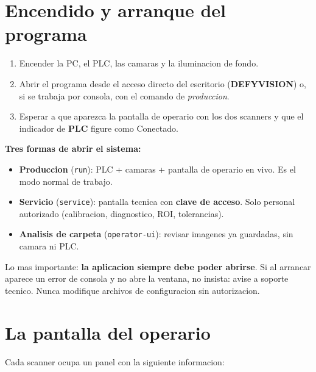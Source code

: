 \documentclass[11pt,a4paper]{article}
\begin{document}
\section{Encendido y arranque del programa}
\begin{enumerate}[leftmargin=1.4em]
  \item Encender la PC, el PLC, las camaras y la iluminacion de fondo.
  \item Abrir el programa desde el acceso directo del escritorio
        (\textbf{DEFYVISION}) o, si se trabaja por consola, con el comando
        de \emph{produccion}.
  \item Esperar a que aparezca la pantalla de operario con los dos scanners
        y que el indicador de \textbf{PLC} figure como \textcolor{okGreen}{Conectado}.
\end{enumerate}

\begin{infobox}
\textbf{Tres formas de abrir el sistema:}
\begin{itemize}[leftmargin=1.2em,nosep]
  \item \textbf{Produccion} (\texttt{run}): PLC + camaras + pantalla de
        operario en vivo. Es el modo normal de trabajo.
  \item \textbf{Servicio} (\texttt{service}): pantalla tecnica con
        \textbf{clave de acceso}. Solo personal autorizado (calibracion,
        diagnostico, ROI, tolerancias).
  \item \textbf{Analisis de carpeta} (\texttt{operator-ui}): revisar
        imagenes ya guardadas, sin camara ni PLC.
\end{itemize}
\end{infobox}

\begin{dangerbox}
Lo mas importante: \textbf{la aplicacion siempre debe poder abrirse}. Si al
arrancar aparece un error de consola y no abre la ventana, no insista:
avise a soporte tecnico. Nunca modifique archivos de configuracion sin
autorizacion.
\end{dangerbox}

\section{La pantalla del operario}
Cada scanner ocupa un panel con la siguiente informacion:
\end{document}

